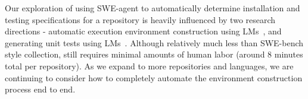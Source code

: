 Our exploration of using SWE-agent to automatically determine installation and testing specifications for a repository is heavily influenced by two research directions - automatic execution environment construction using LMs~\citep{bogin2024superevaluatingagentssetting,eliseeva2025envbenchbenchmarkautomatedenvironment,vergopoulos2025automatedbenchmarkgenerationrepositorylevel}, and generating unit tests using LMs~\citep{mündler2025swtbenchtestingvalidatingrealworld}.
Although relatively much less than SWE-bench style collection, \bugs{} still requires minimal amounts of human labor (around $8$ minutes total per repository).
As we expand \bugs{} to more repositories and languages, we are continuing to consider how to completely automate the environment construction process end to end.
